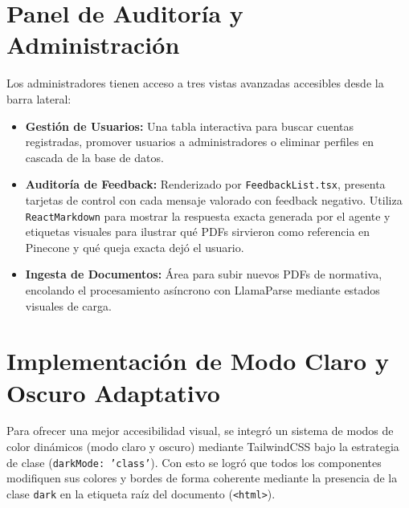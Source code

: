 \documentclass[12pt,a4paper,oneside]{report}
\begin{document}
\section{Panel de Auditoría y Administración}

Los administradores tienen acceso a tres vistas avanzadas accesibles desde la barra lateral:
\begin{itemize}
    \item \textbf{Gestión de Usuarios:} Una tabla interactiva para buscar cuentas registradas, promover usuarios a administradores o eliminar perfiles en cascada de la base de datos.
    \item \textbf{Auditoría de Feedback:} Renderizado por \texttt{FeedbackList.tsx}, presenta tarjetas de control con cada mensaje valorado con feedback negativo. Utiliza \texttt{ReactMarkdown} para mostrar la respuesta exacta generada por el agente y etiquetas visuales para ilustrar qué PDFs sirvieron como referencia en Pinecone y qué queja exacta dejó el usuario.
    \item \textbf{Ingesta de Documentos:} Área para subir nuevos PDFs de normativa, encolando el procesamiento asíncrono con LlamaParse mediante estados visuales de carga.
\end{itemize}

\section{Implementación de Modo Claro y Oscuro Adaptativo}

Para ofrecer una mejor accesibilidad visual, se integró un sistema de modos de color dinámicos (modo claro y oscuro) mediante TailwindCSS bajo la estrategia de clase (\texttt{darkMode: 'class'}). Con esto se logró que todos los componentes modifiquen sus colores y bordes de forma coherente mediante la presencia de la clase \texttt{dark} en la etiqueta raíz del documento (\texttt{<html>}).
\end{document}

